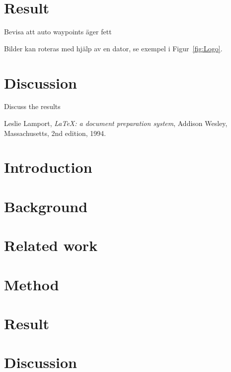 \documentclass[a4paper]{article}
\begin{document}
\section{Result}
Bevisa att auto waypoints äger fett

Bilder kan roteras med hjälp av en dator, se exempel i Figur~\ref{fig:Logo}.

\section{Discussion}
Discuss the results

\begin{thebibliography}{9}

  Leslie Lamport,
  \textit{\LaTeX: a document preparation system},
  Addison Wesley, Massachusetts,
  2nd edition,
  1994.

\end{thebibliography}
\appendix
\cleardoublepage
\section{Introduction}
\section{Background}
\section{Related work}
\section{Method}
\section{Result}
\section{Discussion}
\end{document}

